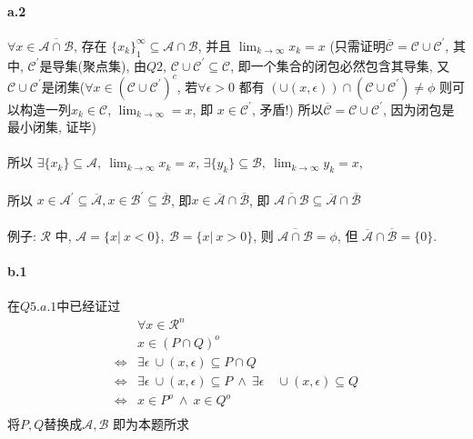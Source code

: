 \documentclass{article}
\begin{document}
\begin{CJK}{UTF8}{gbsn}
  \paragraph{a.2}
    $\forall x \in \overline{\mathcal{A} \cap \mathcal{B}}$, 存在 $\{x_k\}_1^{\infty} \subseteq \mathcal{A} \cap \mathcal{B}$, 并且 $\lim_{k \to \infty} x_k = x$ (只需证明$\overline{\mathcal{C}} = \mathcal{C} \cup \mathcal{C}^{'}$, 其中, $\mathcal{C}^{'}$是导集(聚点集), 由$Q2$, $\mathcal{C} \cup \mathcal{C}^{'} \subseteq \mathcal{C}$, 即一个集合的闭包必然包含其导集, 又$\mathcal{C} \cup \mathcal{C}^{'}$是闭集($\forall x \in (\mathcal{C} \cup \mathcal{C}^{'})^c$, 若$\forall \epsilon > 0$ 都有 $(\cup(x, \epsilon)) \cap (\mathcal{C} \cup \mathcal{C}^{'}) \not= \phi$ 则可以构造一列$x_k \in \mathcal{C}$, $\lim_{k \to \infty} = x$, 即 $x \in \mathcal{C}^{'}$, 矛盾!) 所以$\overline{\mathcal{C}} = \mathcal{C} \cup \mathcal{C}^{'}$, 因为闭包是最小闭集, 证毕)
    \paragraph{}
    所以 $\exists \{x_k\} \subseteq \mathcal{A},\ \lim_{k \to \infty} x_k = x$, $\exists \{y_k\} \subseteq \mathcal{B},\ \lim_{k \to \infty} y_k = x$,
    \paragraph{}
    所以 $x \in \mathcal{A}^{'} \subseteq \overline{\mathcal{A}}, x \in \mathcal{B}^{'} \subseteq \overline{\mathcal{B}}$, 即$x \in \overline{\mathcal{A}} \cap \overline{\mathcal{B}}$, 即 $\overline{\mathcal{A} \cap \mathcal{B}} \subseteq \overline{\mathcal{A}} \cap \overline{\mathcal{B}}$
    \paragraph{}
    例子: $\mathcal{R}$ 中, $\mathcal{A} = \{x |\ x < 0\},\ \mathcal{B} = \{x |\ x > 0\}$, 则 $\overline{\mathcal{A} \cap \mathcal{B}} = \phi$, 但 $\overline{\mathcal{A}} \cap \overline{\mathcal{B}} = \{0\}$.
  \paragraph{b.1}
    在$Q5.a.1$中已经证过
    \begin{equation}
      \begin{aligned}
        & \forall x \in \mathcal{R}^n \\
        & x \in (P \cap Q)^o \\
        \iff & \exists \epsilon \ \cup (x, \epsilon) \subseteq P \cap Q \\
        \iff & \exists \epsilon \ \cup (x, \epsilon) \subseteq P \ \land\  \exists \epsilon \quad \cup (x, \epsilon) \subseteq Q \\
        \iff & x \in P^o \ \land\  x \in Q^o \\
      \end{aligned}
    \end{equation}
    将$P,Q$替换成$\mathcal{A}, \mathcal{B}$ 即为本题所求

\end{CJK}
\end{document}
